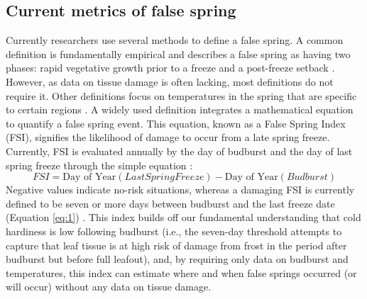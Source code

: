 \documentclass{article}\usepackage[]{graphicx}\usepackage[]{color}
\begin{document}
\subsection*{Current metrics of false spring}
Currently researchers use several methods to define a false spring. A common definition is fundamentally empirical and describes a false spring as having two phases: rapid vegetative growth prior to a freeze and a post-freeze setback \citep{Gu2008}. However, as data on tissue damage is often lacking, most definitions do not require it. Other definitions focus on temperatures in the spring that are specific to certain regions \citep[e.g., in][false spring for the Midwestern United States is defined as a warmer than average March, a freezing April, and enough growing degree days between budburst and the last freeze date]{Augspurger2013}. A widely used definition integrates a mathematical equation to quantify a false spring event. This equation, known as a False Spring Index (FSI), signifies the likelihood of damage to occur from a late spring freeze. Currently, FSI is evaluated annually by the day of budburst and the day of last spring freeze \citep[often calculated at -2.2$^{\circ}$C,][]{Schwartz1993} through the simple equation \citep{Marino2011}:
\begin{equation} \label{eq:1}
FSI = \text{Day of Year} (Last Spring Freeze) - \text{Day of Year} (Budburst)
\end{equation}
Negative values indicate no-risk situations, whereas a damaging FSI is currently defined to be seven or more days between budburst and the last freeze date (Equation \ref{eq:1}) \citep{Peterson2014}. This index builds off our fundamental understanding that cold hardiness is low following budburst (i.e., the seven-day threshold attempts to capture that leaf tissue is at high risk of damage from frost in the period after budburst but before full leafout), and, by requiring only data on budburst and temperatures, this index can estimate where and when false springs occurred (or will occur) without any data on tissue damage. 
\end{document}
